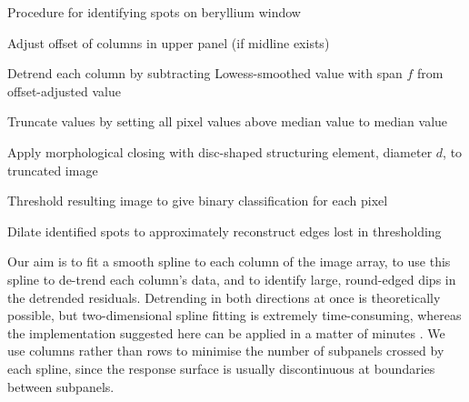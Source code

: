 \documentclass[\main/IO-Pixels.tex]{subfiles}
\begin{document}
\begin{algorithm}
    \caption{Procedure for identifying spots on beryllium window}
	\label{proc:screen-spots}



Adjust offset of columns in upper panel (if midline exists)

Detrend each column by subtracting Lowess-smoothed value with span $f$ from offset-adjusted value

Truncate values by setting all pixel values above median value to median value

Apply morphological closing with disc-shaped structuring element, diameter $d$, to truncated image

Threshold resulting image to give binary classification for each pixel


Dilate identified spots to approximately reconstruct edges lost in thresholding

\end{algorithm}

Our aim is to fit a smooth spline to each column of the image array, to use this spline to de-trend each column's data, and to identify large, round-edged dips in the detrended residuals. Detrending in both directions at once is theoretically possible, but two-dimensional spline fitting is extremely time-consuming, whereas the implementation suggested here can be applied in a matter of minutes . We use columns rather than rows to minimise the number of subpanels crossed by each spline, since the response surface is usually discontinuous at boundaries between subpanels. 
\end{document}
